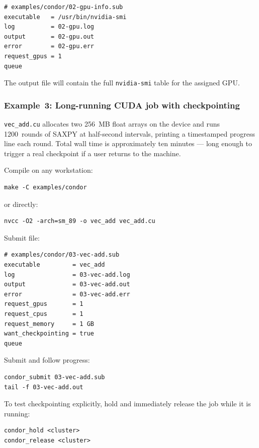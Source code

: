 \documentclass[11pt,a4paper]{article}
\begin{document}
\begin{verbatim}
# examples/condor/02-gpu-info.sub
executable   = /usr/bin/nvidia-smi
log          = 02-gpu.log
output       = 02-gpu.out
error        = 02-gpu.err
request_gpus = 1
queue
\end{verbatim}

The output file will contain the full \texttt{nvidia-smi} table for the
assigned GPU.

\subsubsection*{Example~3: Long-running CUDA job with checkpointing}

\texttt{vec\_add.cu} allocates two 256~MB float arrays on the device and runs
1200~rounds of SAXPY at half-second intervals, printing a timestamped progress
line each round.  Total wall time is approximately ten minutes --- long enough
to trigger a real checkpoint if a user returns to the machine.

Compile on any workstation:

\begin{verbatim}
make -C examples/condor
\end{verbatim}

or directly:

\begin{verbatim}
nvcc -O2 -arch=sm_89 -o vec_add vec_add.cu
\end{verbatim}

Submit file:

\begin{verbatim}
# examples/condor/03-vec-add.sub
executable         = vec_add
log                = 03-vec-add.log
output             = 03-vec-add.out
error              = 03-vec-add.err
request_gpus       = 1
request_cpus       = 1
request_memory     = 1 GB
want_checkpointing = true
queue
\end{verbatim}

Submit and follow progress:

\begin{verbatim}
condor_submit 03-vec-add.sub
tail -f 03-vec-add.out
\end{verbatim}

To test checkpointing explicitly, hold and immediately release the job while
it is running:

\begin{verbatim}
condor_hold <cluster>
condor_release <cluster>
\end{verbatim}
\end{document}
